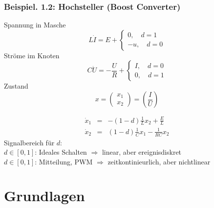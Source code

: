 \documentclass[ngerman]{tudscrreprt}
\begin{document}
\subsection*{\textbf{Beispiel}. 1.2: Hochsteller (Boost Converter)}
Spannung in Masche
\begin{equation*}
L\dot I = E + \left\{ 
\begin{matrix}
0 , \quad d=1\\ 
-u, \quad d=0
\end{matrix}
\right .
\end{equation*}
Ströme im Knoten 
\begin{equation*}
C\dot U = -\frac{U}{R} + \left\{ 
\begin{matrix}
I, \quad d=0\\ 
0, \quad d=1
\end{matrix}
\right .
\end{equation*}
Zustand 
\begin{equation*}
x = \begin{pmatrix} x_1\\ x_2 \end{pmatrix} = (\frac{I}{U})
\end{equation*}


\begin{equation*}
\begin{matrix}
\dot x_1 &=& -(1-d) \frac{1}{L}x_2 + \frac{E}{L}\\ 
\dot x_2 &=& (1-d) \frac{1}{C} x_1 - \frac{1}{RC}x_2
\end{matrix}
\end{equation*}
Signalbereich für $d$:\\  
$d\in [ 0, 1]$: Ideales Schalten $\Rightarrow$ linear, aber ereignisdiskret\\ 
$d\in [ 0,1 ]$: Mitteilung, PWM $\Rightarrow$ zeitkontinieurlich, aber nichtlinear
\chapter{Grundlagen}
\end{document}
